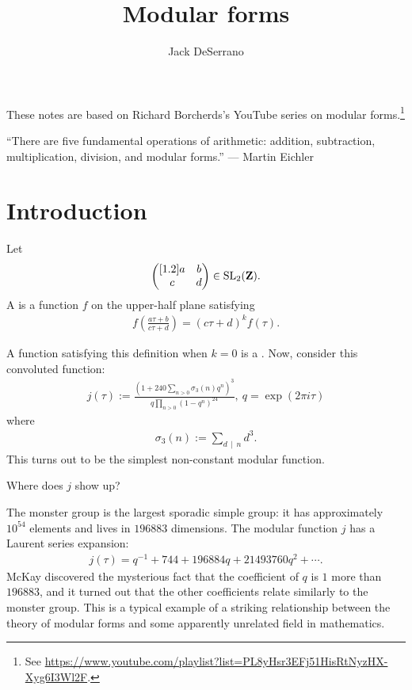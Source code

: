 \documentclass[11pt, oneside,margin=1in]{article}
\title{Modular forms}
\author{Jack DeSerrano}
\begin{document}
\ifams
    \vspace*{\fill}
\fi
\maketitle
These notes are based on Richard Borcherds's YouTube series on modular forms.\footnote{See \url{https://www.youtube.com/playlist?list=PL8yHsr3EFj51HisRtNyzHX-Xyg6I3Wl2F}.}
\ifams
	\vspace*{\fill}
\fi
\vfill
\begin{center}
	``There are five fundamental operations of arithmetic: addition, subtraction, multiplication, division, and modular forms.'' --- Martin Eichler
\end{center}
{\vfill}
\newpage
\section{Introduction}
\begin{definition}\label{}\text{}
Let 
\begin{align*}
	\begin{pmatrix} [ 1.2 ] a&b\\c&d\end{pmatrix} \in \operatorname{SL}_{2}(\mathbf Z).
\end{align*}
A  is a function $f$ on the upper-half plane satisfying
\begin{align*}
	f\left( \frac{a\tau + b}{c\tau + d} \right) = (c\tau + d) ^k f(\tau).
\end{align*}
\end{definition}
\begin{example}\label{}\text{}
A function satisfying this definition when $k=0$ is a . Now, consider this convoluted function:
\begin{align*}
	j(\tau) :=  \frac{\left(1 + 240 \sum_{n>0}^{} \sigma_3(n)q^n \right)^3}{q \prod_{n>0} (1-q^n)^{24}},\ q= \exp(2\pi i \tau)
\end{align*}
where
\begin{align*}
	\sigma_3(n) :=  \sum_{d\, \mid\,  n}^{} d^3.
\end{align*}
This turns out to be the simplest non-constant modular function.
\end{example}

Where does $j$ show up?

\begin{example}\label{}\text{}
The monster group is the largest sporadic simple group: it has approximately $10^{54}$ elements and lives in $196883$ dimensions. The modular function $j$ has a Laurent series expansion:
\begin{align*}
	j(\tau) = q ^{-1} + 744 + 196884q + 21493760q^2 + \cdots.
\end{align*}
McKay discovered the mysterious fact that the coefficient of $q$ is $1$ more than $196883$, and it turned out that the other coefficients relate similarly to the monster group. This is a typical example of a striking relationship between the theory of modular forms and some apparently unrelated field in mathematics. 
\end{example}
\end{document}
